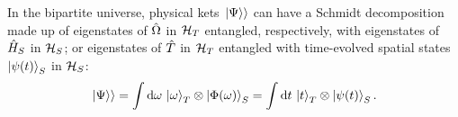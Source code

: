 
In the bipartite universe, physical kets $\left.\left| \Psi \right\rangle\right\rangle$ can have a Schmidt decomposition
made up of
eigenstates of $\hat{\Omega}$ in $\mathcal{H}_T$
entangled, respectively, with
eigenstates of $\hat{H}_S$ in $\mathcal{H}_S$;
or eigenstates of $\hat{T}$ in $\mathcal{H}_T$
entangled with time-evolved spatial states~$\ket{\psi(t)}_S$ in $\mathcal{H}_S$:
\begin{equation}\label{eq:pw:time_freq_nomu}
  \left.\left| \Psi \right\rangle\right\rangle =
    \int \dd{\omega} \, \ket{\omega}_{T}\otimes\ket{\Phi(\omega)}_{S} =
    \int \dd{t} \, \ket{t}_{T} \otimes \ket{\psi(t)}_{S} \text{.}
\end{equation}
%
%
%

